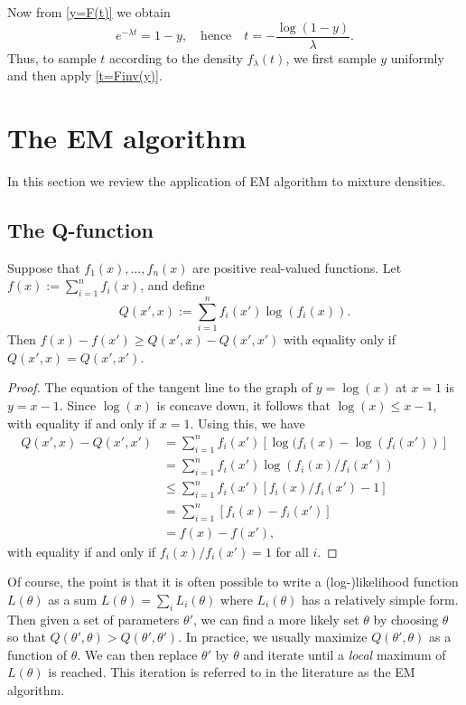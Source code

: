 \documentclass[12pt,leqno]{article}
\begin{document}
Now from \eqref{y=F(t)} we obtain
\begin{equation}\label{t=Finv(y)}
  e^{-\lambda{t}} = 1 -y,\quad\text{hence}\quad t = -\frac{\log(1-y)}{\lambda}.
\end{equation}
Thus, to sample $t$ according to the density $f_{\lambda}(t)$, we first sample $y$ uniformly and then apply
\eqref{t=Finv(y)}.

\section{The EM algorithm}
In this section we review the application of EM algorithm to mixture densities.

\subsection{The Q-function}\label{Qf} 
\begin{Lem}\label{Qfunct} Suppose that $f_1(x),\dots,f_n(x)$ are positive real-valued functions.
Let $f(x):= \sum_{i=1}^nf_i(x)$, and define 
$$
Q(x',x):= \sum_{i=1}^nf_i(x')\log(f_i(x)).
$$
Then $ f(x) - f(x') \ge Q(x',x) - Q(x',x')$ with equality only if
$Q(x',x) = Q(x',x')$.
\end{Lem}
\begin{proof}
The equation of the tangent line to the graph of $y = \log(x)$ at $x = 1$ is $y = x - 1$.
Since $\log(x)$ is concave down, it follows that 
$\log(x) \le x - 1$, with equality if and only if $x = 1$. Using this, we have
\begin{align*}
Q(x',x) - Q(x',x') &= \sum_{i=1}^nf_i(x')[\log(f_i(x) - \log(f_i(x'))] \\
&= \sum_{i=1}^nf_i(x')\log(f_i(x)/f_i(x')) \\
&\le \sum_{i=1}^nf_i(x')[f_i(x)/f_i(x') - 1] \\
&= \sum_{i=1}^n[f_i(x) - f_i(x')] \\
&= f(x) - f(x'),
\end{align*}
with equality if and only if $f_i(x)/f_i(x') = 1$ for all $i$.
\end{proof}

Of course, the point is that it is often possible to write a (log-)likelihood
function $L(\theta)$ as a sum $L(\theta) = \sum_iL_i(\theta)$ where $L_i(\theta)$ has
a relatively simple form. Then given a set of parameters $\theta'$, we can find a
more likely set $\theta$ by choosing $\theta$ so that $Q(\theta',\theta) >
Q(\theta',\theta')$.  In practice, we usually maximize $Q(\theta',\theta)$ as a function of
$\theta$.  We can then replace $\theta'$ by $\theta$ and iterate until a {\em
  local} maximum of $L(\theta)$ is reached.    This iteration is referred to in the literature
as the EM algorithm.
\end{document}
